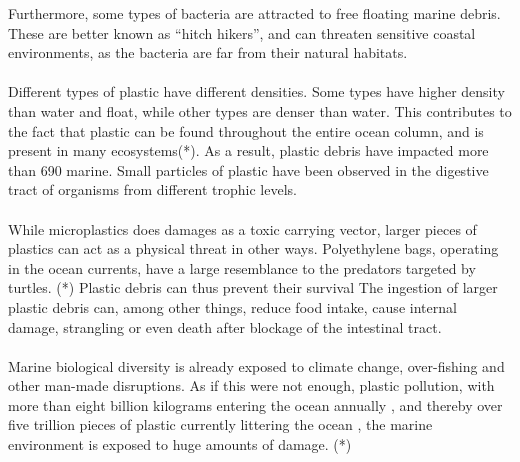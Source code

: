 Furthermore, some types of bacteria are attracted to free floating marine debris. These are better known as “hitch hikers”, and can threaten sensitive coastal environments, as the bacteria are far from their natural habitats. 
\\\\
Different types of plastic have different densities. Some types have higher density than water and float, while other types are denser than water. This contributes to the fact that plastic can be found throughout the entire ocean column, and is present in many ecosystems(*). As a result, plastic debris have impacted more than 690 marine. Small particles of plastic have been observed in the digestive tract of organisms from different trophic levels. 
\\\\
While microplastics does damages as a toxic carrying vector, larger pieces of plastics can act as a physical threat in other ways. Polyethylene bags, operating in the ocean currents, have a large resemblance to the predators targeted by turtles. (*) Plastic debris can thus prevent their survival %
The ingestion of larger plastic debris can, among other things, reduce food intake, cause internal damage, strangling or even death after blockage of the intestinal tract. %
\\\\
Marine biological diversity is already exposed to climate change, over-fishing and other man-made disruptions. As if this were not enough, plastic pollution, with more than eight billion kilograms entering the ocean annually %
, and thereby over five trillion pieces of plastic currently littering the ocean , the marine environment is exposed to huge amounts of damage. (*)

